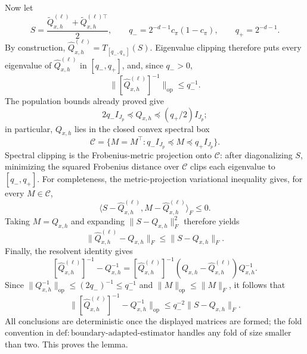 Now let
\[
 S=\frac{\widetilde Q^{(\ell)}_{x,h}+\widetilde Q^{(\ell)\top}_{x,h}}2,
 \qquad q_-=2^{-d-1}c_\pi(1-c_\pi),
 \qquad q_+=2^{-d-1}.
\]
By construction, \(\widehat Q^{(\ell)}_{x,h}=T_{[q_-,q_+]}(S)\). Eigenvalue clipping therefore puts every eigenvalue of \(\widehat Q^{(\ell)}_{x,h}\) in \([q_-,q_+]\), and, since \(q_->0\),
\[
 \bigl\|[\widehat Q^{(\ell)}_{x,h}]^{-1}\bigr\|_{\mathrm{op}}
 \le q_-^{-1}.
\]
The population bounds already proved give
\[
 2q_-I_{J_p}\preceq Q_{x,h}\preceq(q_+/2)I_{J_p};
\]
in particular, \(Q_{x,h}\) lies in the closed convex spectral box
\[
 \mathcal C=\{M=M^\top:q_-I_{J_p}\preceq M\preceq q_+I_{J_p}\}.
\]
Spectral clipping is the Frobenius-metric projection onto \(\mathcal C\): after diagonalizing \(S\), minimizing the squared Frobenius distance over \(\mathcal C\) clips each eigenvalue to \([q_-,q_+]\). For completeness, the metric-projection variational inequality gives, for every \(M\in\mathcal C\),
\[
 \langle S-\widehat Q^{(\ell)}_{x,h},M-\widehat Q^{(\ell)}_{x,h}\rangle_F\le0.
\]
Taking \(M=Q_{x,h}\) and expanding \(\|S-Q_{x,h}\|_F^2\) therefore yields
\[
 \|\widehat Q^{(\ell)}_{x,h}-Q_{x,h}\|_F
 \le \|S-Q_{x,h}\|_F.
\]
Finally, the resolvent identity gives
\[
 [\widehat Q^{(\ell)}_{x,h}]^{-1}-Q_{x,h}^{-1}
 = [\widehat Q^{(\ell)}_{x,h}]^{-1}
 (Q_{x,h}-\widehat Q^{(\ell)}_{x,h})Q_{x,h}^{-1}.
\]
Since \(\|Q_{x,h}^{-1}\|_{\mathrm{op}}\le(2q_-)^{-1}\le q_-^{-1}\) and \(\|M\|_{\mathrm{op}}\le\|M\|_F\), it follows that
\[
 \bigl\|[\widehat Q^{(\ell)}_{x,h}]^{-1}-Q_{x,h}^{-1}\bigr\|_{\mathrm{op}}
 \le q_-^{-2}\|S-Q_{x,h}\|_F.
\]
All conclusions are deterministic once the displayed matrices are formed; the fold convention in \(\mathrm{def:boundary\text{-}adapted\text{-}estimator}\) handles any fold of size smaller than two. This proves the lemma.